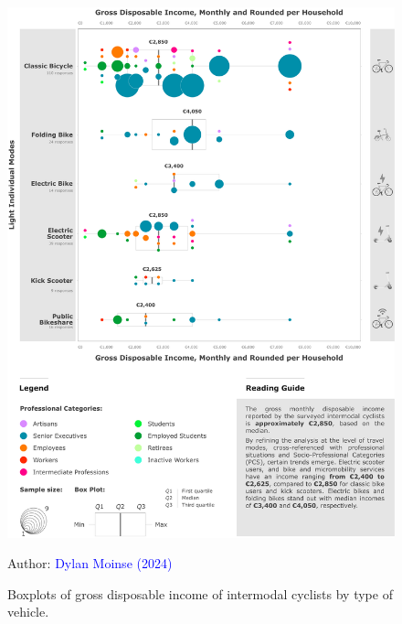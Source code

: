 \begin{refsegment}
    \begin{figure}[h!]\vspace*{4pt}
        \caption{Boxplots of gross disposable income of intermodal cyclists by type of vehicle.}
        \label{fig-chap4:revenus}
        \centerline{\includegraphics[width=1\columnwidth]{src/Figures/Chap-4/EN_Revenus.pdf}}
        \vspace{5pt}
        \begin{flushright}\scriptsize{
        Author: \textcolor{blue}{Dylan Moinse (2024)}
        }\end{flushright}
    \end{figure}


\end{refsegment}
